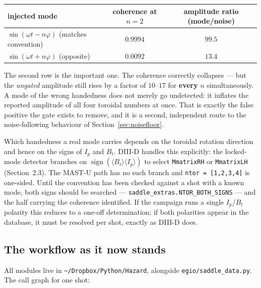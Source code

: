 \documentclass[11pt,a4paper]{article}
\newcommand{\code}[1]{\texttt{\small #1}}
\begin{document}
\begin{center}
\begin{tabular}{@{}lcc@{}}
\toprule
injected mode & coherence at $n=2$ & amplitude ratio (mode/noise) \\
\midrule
$\sin(\omega t - n\varphi)$ \quad(matches convention) & $0.9994$ & $99.5$ \\
$\sin(\omega t + n\varphi)$ \quad(opposite)           & $0.0092$ & $13.4$ \\
\bottomrule
\end{tabular}
\end{center}

\noindent
The second row is the important one. The coherence correctly collapses --- but the
\emph{ungated} amplitude still rises by a factor of $10$--$17$ for \textbf{every} $n$
simultaneously. A mode of the wrong handedness does not merely go undetected: it inflates
the reported amplitude of all four toroidal numbers at once. That is exactly the false
positive the gate exists to remove, and it is a second, independent route to the noise-following
behaviour of Section~\ref{sec:noisefloor}.

Which handedness a real mode carries depends on the toroidal rotation direction and hence
on the signs of $I_p$ and $B_t$. DIII-D handles this explicitly: the locked-mode detector
branches on $\operatorname{sign}(\langle B_t\rangle \langle I_p\rangle)$ to select
\code{MmatrixRH} or \code{MmatrixLH} (Section~2.3). The MAST-U path has no such branch and
\code{ntor = [1,2,3,4]} is one-sided. Until the convention has been checked against a shot
with a known mode, both signs should be searched --- \code{saddle\_extras.NTOR\_BOTH\_SIGNS}
--- and the half carrying the coherence identified. If the campaign runs a single $I_p$/$B_t$
polarity this reduces to a one-off determination; if both polarities appear in the database,
it must be resolved per shot, exactly as DIII-D does.

\subsection{The workflow as it now stands}

All modules live in \code{\textasciitilde/Dropbox/Python/Hazard}, alongside
\code{egio/saddle\_data.py}. The call graph for one shot:
\end{document}
